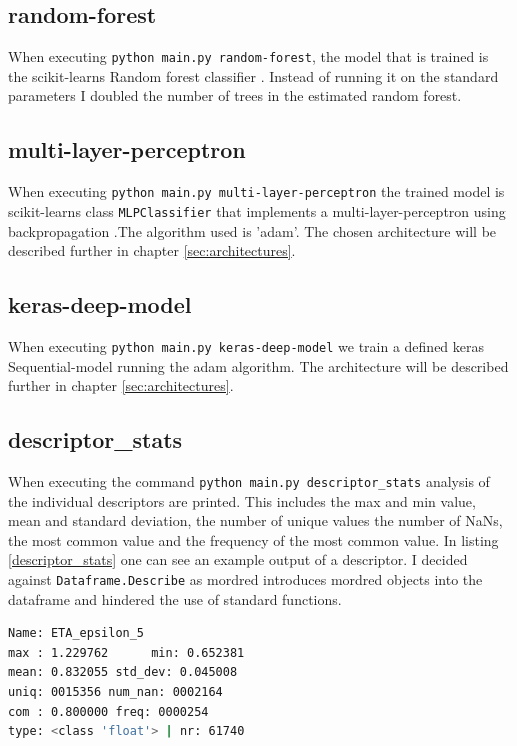 \documentclass[12pt]{article}
\begin{document}
\subsection{random-forest}
When executing \texttt{python main.py random-forest}, the model that is trained is the scikit-learns Random forest classifier \cite{RandomForest}. Instead of running it on the standard parameters I doubled the number of trees in the estimated random forest.

\subsection{multi-layer-perceptron}
When executing \texttt{python main.py multi-layer-perceptron} the trained model is scikit-learns class \texttt{MLPClassifier} that implements a multi-layer-perceptron using backpropagation \cite{MLPclassifier}.The algorithm used is 'adam'. The chosen architecture will be described further in chapter \ref{sec:architectures}.

\subsection{keras-deep-model}
When executing \texttt{python main.py keras-deep-model} we train a defined keras Sequential-model running the adam algorithm. The architecture will be described further in chapter \ref{sec:architectures}. 

\subsection{descriptor\_stats}
When executing the command \texttt{python main.py descriptor\_stats} analysis of the individual descriptors are printed. This includes the max and min value, mean and standard deviation, the number of unique values the number of NaNs, the most common value and the frequency of the most common value. In listing \ref{descriptor_stats} one can see an example output of a descriptor. I decided against \texttt{Dataframe.Describe} as mordred introduces mordred objects into the dataframe and hindered the use of standard functions. 

\begin{lstlisting}[language=bash,caption={Statistics about the ETA\_espilon\_5 descriptor},label=descriptor_stats]
Name: ETA_epsilon_5  
max : 1.229762      min: 0.652381
mean: 0.832055 std_dev: 0.045008
uniq: 0015356 num_nan: 0002164
com : 0.800000 freq: 0000254 
type: <class 'float'> | nr: 61740  
\end{lstlisting}
\end{document}
